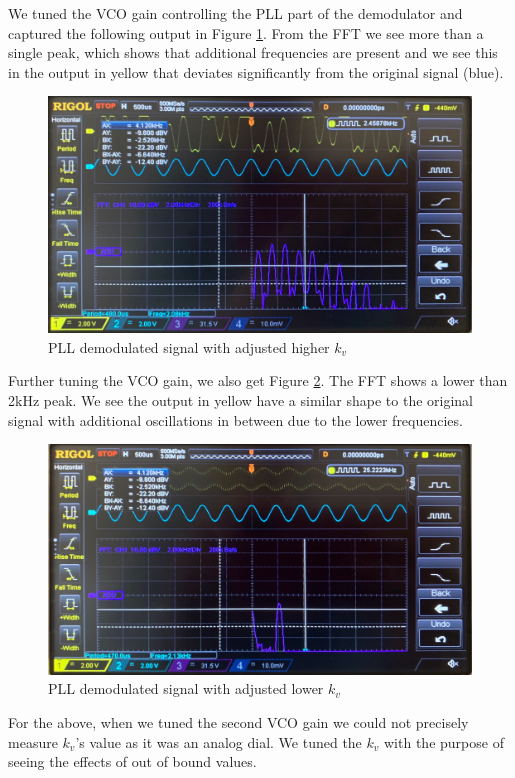 \documentclass[11pt]{article}
\begin{document}
\begin{enumerate}[label=(\alph*)]
We tuned the VCO gain controlling the PLL part of the demodulator and captured the following output in Figure \ref{fig:W3Q6b_}. From the FFT we see more than a single peak, which shows that additional frequencies are present and we see this in the output in yellow that deviates significantly from the original signal (blue).
\begin{figure}[H]
    \centering
    \includegraphics[width=15cm]{W3Q6b_.jpg}
    \caption{PLL demodulated signal with adjusted higher $k_v$}
    \label{fig:W3Q6b_}
\end{figure}
Further tuning the VCO gain, we also get Figure \ref{fig:W3Q6b_a}. The FFT shows a lower than 2kHz peak. We see the output in yellow have a similar shape to the original signal with additional oscillations in between due to the lower frequencies.
\begin{figure}[H]
    \centering
    \includegraphics[width=15cm]{W3Q6b_a.jpg}
    \caption{PLL demodulated signal with adjusted lower $k_v$}
    \label{fig:W3Q6b_a}
\end{figure}
For the above, when we tuned the second VCO gain we could not precisely measure $k_v$'s value as it was an analog dial. We tuned the $k_v$ with the purpose of seeing the effects of out of bound values. 
\end{enumerate}
\end{document}
